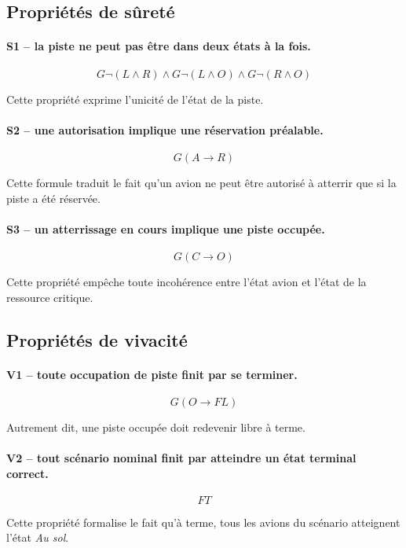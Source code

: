 \documentclass[11pt,a4paper]{article}
\begin{document}
\subsection{Propriétés de sûreté}

\paragraph{S1 -- la piste ne peut pas être dans deux états à la fois.}
\[
G\neg(L \land R) \land G\neg(L \land O) \land G\neg(R \land O)
\]

Cette propriété exprime l'unicité de l'état de la piste.

\paragraph{S2 -- une autorisation implique une réservation préalable.}
\[
G(A \rightarrow R)
\]

Cette formule traduit le fait qu'un avion ne peut être autorisé à atterrir que si la piste a été réservée.

\paragraph{S3 -- un atterrissage en cours implique une piste occupée.}
\[
G(C \rightarrow O)
\]

Cette propriété empêche toute incohérence entre l'état avion et l'état de la ressource critique.

\subsection{Propriétés de vivacité}

\paragraph{V1 -- toute occupation de piste finit par se terminer.}
\[
G(O \rightarrow F L)
\]

Autrement dit, une piste occupée doit redevenir libre à terme.

\paragraph{V2 -- tout scénario nominal finit par atteindre un état terminal correct.}
\[
F T
\]

Cette propriété formalise le fait qu'à terme, tous les avions du scénario atteignent l'état \emph{Au sol}.
\end{document}
